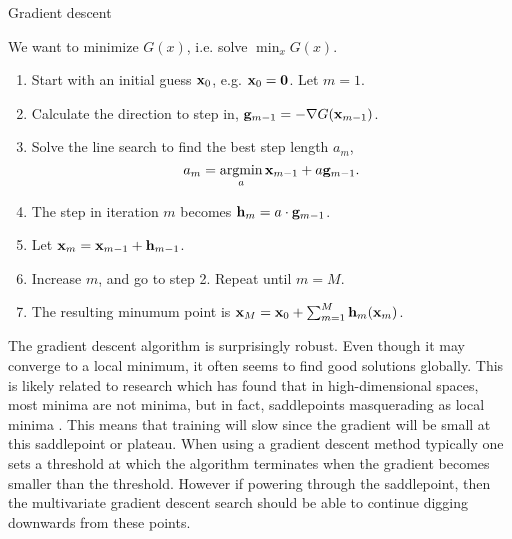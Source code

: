 \begin{algorithm}
\caption{Gradient descent}
\label{algo:grad-desc}
We want to minimize $G(x)$, i.e. solve $\min_{x}G(x)$.
\begin{enumerate}
    \item Start with an initial guess $\mathbf{x}_0$, e.g. $\mathbf{x}_0=\mathbf{0}$. Let $m=1$.
    \item Calculate the direction to step in, $\mathbf{g}_{m-1}=-\nabla G(\mathbf{x}_{m-1})$.
    \item Solve the line search to find the best step length $a_m$,
        \begin{equation*}
            a_m=\operatorname*{argmin}_{a}\mathbf{x}_{m-1}+a \mathbf{g}_{m-1}.
        \end{equation*}
    \item The step in iteration $m$ becomes $\mathbf{h}_m=a\cdot\mathbf{g}_{m-1}$.
    \item Let $\mathbf{x}_m=\mathbf{x}_{m-1}+\mathbf{h}_{m-1}$.
    \item Increase $m$, and go to step 2. Repeat until $m=M$.
    \item The resulting minumum point is $\mathbf{x}_M=\mathbf{x}_0+\sum_{m=1}^M\mathbf{h}_m(\mathbf{x}_m)$.
\end{enumerate}
\end{algorithm}
The gradient descent algorithm is surprisingly robust. Even though it may converge to a local minimum, it often seems to find good solutions globally. This is likely related to research which has found that in high-dimensional spaces, most minima are not minima, but in fact, saddlepoints masquerading as local minima \citep{saddlepoints}. This means that training will slow since the gradient will be small at this saddlepoint or plateau. When using a gradient descent method typically one sets a threshold at which the algorithm terminates when the gradient becomes smaller than the threshold. However if powering through the saddlepoint, then the multivariate gradient descent search should be able to continue digging downwards from these points.


